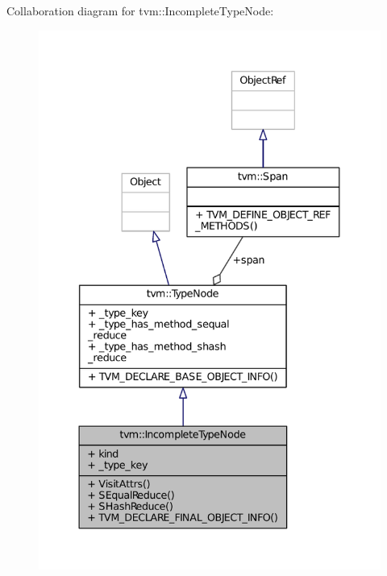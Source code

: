 Collaboration diagram for tvm\+:\+:Incomplete\+Type\+Node\+:
\nopagebreak
\begin{figure}[H]
\begin{center}
\leavevmode
\includegraphics[width=337pt]{classtvm_1_1IncompleteTypeNode__coll__graph}
\end{center}
\end{figure}
